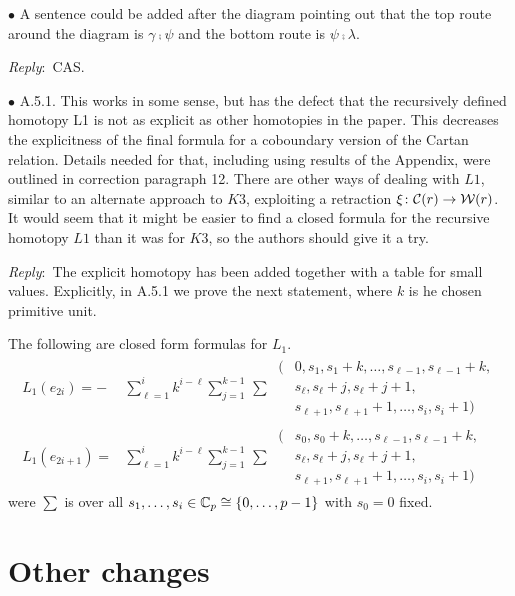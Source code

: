 \documentclass{amsart}
\newcommand{\ar}{\medskip\noindent\textit{Reply}:\ }
\def\subitem{\medskip\noindent$\bullet$ }
\begin{document}
\begin{enumerate}
	\subitem A sentence could be added after the diagram pointing out that the top route
	around the diagram is $\gamma \comp \psi$ and the bottom route is $\psi \comp \lambda$.

	\ar CAS.

	\subitem A.5.1. This works in some sense, but has the defect that the recursively defined homotopy
	L1 is not as explicit as other homotopies in the paper.
	This decreases the explicitness of the final formula for a coboundary version of the Cartan relation.
	Details needed for that, including using results of the Appendix, were outlined in correction paragraph 12.
	There are other ways of dealing with $L1$, similar to an alternate approach to $K3$, exploiting a
	retraction $\xi \colon \mathcal{C}(r) \to \mathcal{W}(r)$.
	It would seem that it might be easier to find a closed formula for the recursive homotopy $L1$ than it was for $K3$, so the authors should give it a try.

	\ar The explicit homotopy has been added together with a table for small values.
	Explicitly, in A.5.1 we prove the next statement, where $k$ is he chosen primitive unit.

	\begin{lemma*}
		The following are closed form formulas for $L_1$.
		\begin{align*}
			L_1(e_{2i}) =
			- &\sum_{\ell = 1}^i k^{i-\ell} \sum_{j=1}^{k-1} \, \sum \
			\begin{aligned}
				\big(&0,s_1,s_1+k,\ldots,s_{\ell-1},s_{\ell-1}+k, \\
				&s_{\ell},s_{\ell}+j,s_{\ell}+j+1, \\
				&s_{\ell+1},s_{\ell+1}+1,\ldots,s_i,s_i+1\big)
			\end{aligned} \\[5pt]
			L_1(e_{2i+1}) =
			&\sum_{\ell = 1}^i k^{i-\ell} \sum_{j=1}^{k-1} \, \sum \
			\begin{aligned}
				\big(&s_0,s_0+k,\ldots,s_{\ell-1},s_{\ell-1}+k, \\
				&s_{\ell},s_{\ell}+j,s_{\ell}+j+1, \\
				&s_{\ell+1},s_{\ell+1}+1,\ldots,s_i,s_i+1\big)
			\end{aligned}
		\end{align*}
		were $\sum$ is over all $s_1,\dots,s_i \in \mathbb{C}_p \cong \{0,\dots,p-1\}$ with $s_0 = 0$ fixed.
	\end{lemma*}
\end{enumerate}

\section{Other changes}
\end{document}
